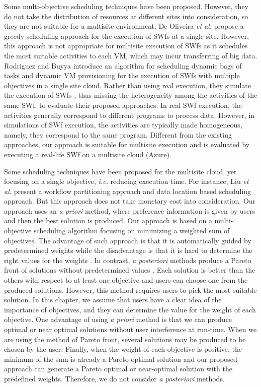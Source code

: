 Some multi-objective scheduling techniques \cite{Oliveira2012, Fard2014, Rodriguez2015} have been proposed. However, they do not take the distribution of resources at different sites into consideration, so they are not suitable for a multisite environment. 
De Oliveira \textit{et al.} \cite{Oliveira2012} propose a greedy scheduling approach for the execution of SWfs at a single site. However, this approach is not appropriate for multisite execution of SWfs as it schedules the most suitable activities to each VM, which may incur transferring of big data.
Rodriguez and Buyya \cite{Rodriguez2015} introduce an algorithm for scheduling dynamic bags of tasks and dynamic VM provisioning for the execution of SWfs with multiple objectives in a single site cloud. Rather than using real execution, they simulate the execution of SWfs , thus missing the heterogeneity among the activities of the same SWf, to evaluate their proposed approaches. In real SWf execution, the activities generally correspond to different programs to process data. However, in simulations of SWf execution, the activities are typically made homogeneous, namely, they correspond to the same program. 
Different from the existing approaches, our approach is suitable for multisite execution and is evaluated by executing a real-life SWf on a multisite cloud (Azure).

Some scheduling techniques have been proposed for the multisite cloud, yet focusing on a single objective, \textit{i.e.} reducing execution time.
For instance, Liu \textit{et al.} \cite{Liu2014} present a workflow partitioning approach and data location based scheduling approach. But this approach does not take monetary cost into consideration. Our approach uses an \textit{a priori} method, where preference information is given by users and then the best solution is produced. Our approach is based on a multi-objective scheduling algorithm focusing on minimizing a weighted sum of objectives. The advantage of such approach is that it is automatically guided by predetermined weights while the disadvantage is that it is hard to determine the right values for the weights \cite{Blagodurov2015}. In contrast, \textit{a posteriori} methods produce a Pareto front of solutions without predetermined values \cite{Blagodurov2015}. Each solution is better than the others with respect to at least one objective and users can choose one from the produced solutions. However, this method requires users to pick the most suitable solution. In this chapter, we assume that users have a clear idea of the importance of objectives, and they can determine the value for the weight of each objective. One advantage of using \textit{a priori} method  is that we can produce optimal or near optimal solutions without user interference at run-time. When we are using the method of Pareto front, several solutions may be produced to be chosen by the user. Finally, when the weight of each objective is positive, the minimum of the sum is already a Pareto optimal solution \cite{Zadeh1963} \cite{Marler2004} and our proposed approach can generate a Pareto optimal or near-optimal solution with the predefined weights. Therefore, we do not consider \textit{a posteriori} methods.

